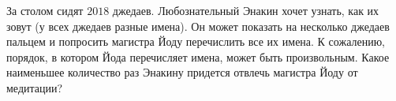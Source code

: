 За столом сидят $2018$ джедаев. Любознательный Энакин хочет узнать, как их зовут (у всех джедаев разные имена). Он может показать на несколько джедаев пальцем и попросить магистра Йоду перечислить все их имена. К сожалению, порядок, в котором Йода перечисляет имена, может быть произвольным. Какое наименьшее количество раз Энакину придется отвлечь магистра Йоду от медитации?